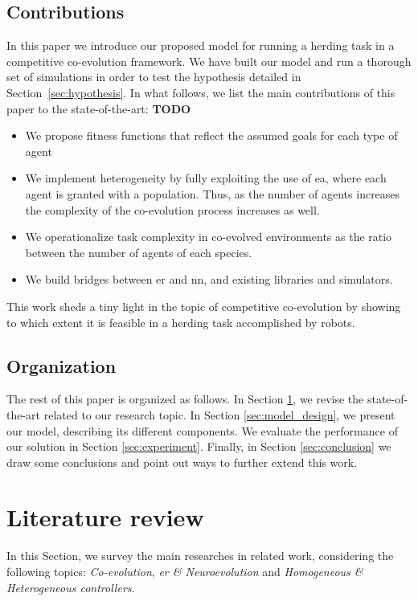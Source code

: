 \documentclass[conference]{IEEEtran}
\begin{document}
\subsection{Contributions}
In this paper we introduce our proposed model for running a herding task in a competitive co-evolution framework. 
We have built our model and run a thorough set of simulations in order to test the hypothesis detailed in Section~\ref{sec:hypothesis}. 
In what follows, we list the main contributions of this paper to the state-of-the-art:
\textbf{TODO}
\begin{itemize}
	\item We propose fitness functions that reflect the assumed goals for each type of agent
	\item We implement heterogeneity by fully exploiting the use of \gls{ea}, where each agent is granted with a population. Thus, as the number of agents increases the complexity of the co-evolution process increases as well.
	\item We operationalize task complexity in co-evolved environments as the ratio between the number of agents of each species.
	\item We build bridges between \gls{er} and \gls{nn}, and existing libraries and simulators.
\end{itemize}

This work sheds a tiny light in the topic of competitive co-evolution by showing to which extent it is feasible in a herding task accomplished by robots.

\subsection{Organization}
The rest of this paper is organized as follows. 
In Section \ref{sec:lit_review}, we revise the state-of-the-art related to our research topic. 
In Section \ref{sec:model_design}, we present our model, describing its different components. 
We evaluate the performance of our solution in Section \ref{sec:experiment}. 
Finally, in Section \ref{sec:conclusion} we draw some conclusions and point out ways to further extend this work.

\section{Literature review}
\label{sec:lit_review}
In this Section, we survey the main researches in related work, considering the following topics: \textit{Co-evolution}, \textit{\acrlong{er} \& Neuroevolution} and \textit{Homogeneous \& Heterogeneous controllers}.
 
\end{document}
